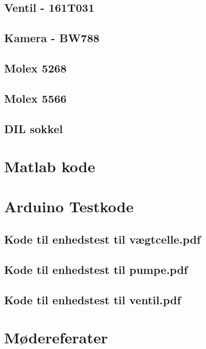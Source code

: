 \subsection{Ventil - 161T031}
\label{bilag:ventil}

\subsection{Kamera - BW788}

\subsection{Molex 5268}

\subsection{Molex 5566}


\subsection{DIL sokkel}

\section{Matlab kode}
\newpage
\section{Arduino Testkode}

\subsection{Kode til enhedstest til vægtcelle.pdf} 
\label{bilag:TKloadcell}


\subsection{Kode til enhedstest til pumpe.pdf}
\label{bilag:TKpumpe}

\subsection{Kode til enhedstest til ventil.pdf}
\label{bilag:TKventil}

\section{Mødereferater}
\label{mode}

